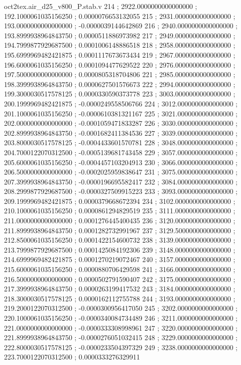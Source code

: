 \begin{filecontents}[overwrite]{oct2tex.air_d25_v800_P.stab.v}
214 ; 2922.0000000000000000 ; 192.1000061035156250 ; 0.0000076653132055
215 ; 2931.0000000000000000 ; 193.0000000000000000 ; -0.0000039144642869
216 ; 2940.0000000000000000 ; 193.8999938964843750 ; 0.0000511886973982
217 ; 2949.0000000000000000 ; 194.7999877929687500 ; 0.0001006148886518
218 ; 2958.0000000000000000 ; 195.6999969482421875 ; 0.0001117673673434
219 ; 2967.0000000000000000 ; 196.6000061035156250 ; 0.0001094477629522
220 ; 2976.0000000000000000 ; 197.5000000000000000 ; 0.0000805318704806
221 ; 2985.0000000000000000 ; 198.3999938964843750 ; 0.0000627501576673
222 ; 2994.0000000000000000 ; 199.3000030517578125 ; 0.0000330590373778
223 ; 3003.0000000000000000 ; 200.1999969482421875 ; -0.0000249558506766
224 ; 3012.0000000000000000 ; 201.1000061035156250 ; -0.0000610381321167
225 ; 3021.0000000000000000 ; 202.0000000000000000 ; -0.0001059471833287
226 ; 3030.0000000000000000 ; 202.8999938964843750 ; -0.0001682411384536
227 ; 3039.0000000000000000 ; 203.8000030517578125 ; -0.0004433601570781
228 ; 3048.0000000000000000 ; 204.7000122070312500 ; -0.0005139681743458
229 ; 3057.0000000000000000 ; 205.6000061035156250 ; -0.0004457103204913
230 ; 3066.0000000000000000 ; 206.5000000000000000 ; -0.0002025959838647
231 ; 3075.0000000000000000 ; 207.3999938964843750 ; -0.0000196695582417
232 ; 3084.0000000000000000 ; 208.2999877929687500 ; -0.0000327509915223
233 ; 3093.0000000000000000 ; 209.1999969482421875 ; 0.0000379668672394
234 ; 3102.0000000000000000 ; 210.1000061035156250 ; 0.0000861294829519
235 ; 3111.0000000000000000 ; 211.0000000000000000 ; 0.0001276445400435
236 ; 3120.0000000000000000 ; 211.8999938964843750 ; 0.0001282732991967
237 ; 3129.5000000000000000 ; 212.8500061035156250 ; 0.0001422154600732
238 ; 3139.0000000000000000 ; 213.7999877929687500 ; 0.0001425084192306
239 ; 3148.0000000000000000 ; 214.6999969482421875 ; 0.0001270219072467
240 ; 3157.0000000000000000 ; 215.6000061035156250 ; 0.0000880706429598
241 ; 3166.0000000000000000 ; 216.5000000000000000 ; 0.0000502791590407
242 ; 3175.0000000000000000 ; 217.3999938964843750 ; 0.0000263199417532
243 ; 3184.0000000000000000 ; 218.3000030517578125 ; 0.0000162112755788
244 ; 3193.0000000000000000 ; 219.2000122070312500 ; -0.0000300956417050
245 ; 3202.0000000000000000 ; 220.1000061035156250 ; -0.0000340084734489
246 ; 3211.0000000000000000 ; 221.0000000000000000 ; -0.0000333308998961
247 ; 3220.0000000000000000 ; 221.8999938964843750 ; -0.0000276051032415
248 ; 3229.0000000000000000 ; 222.8000030517578125 ; -0.0000233504397329
249 ; 3238.0000000000000000 ; 223.7000122070312500 ; 0.0000333276329911

\end{filecontents}
